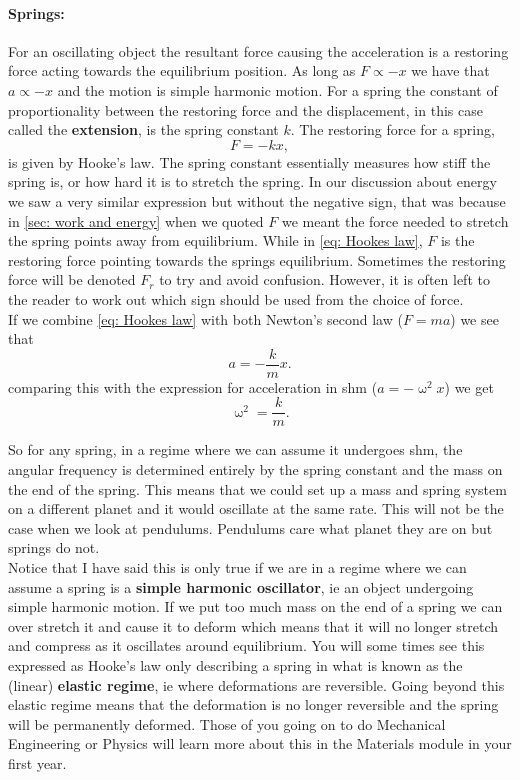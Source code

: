 \documentclass[a4paper,12pt]{book}
\begin{document}
\paragraph{Springs:} For an oscillating object the resultant force causing the acceleration is a restoring force acting towards the equilibrium position. As long as $F\propto -x$ we have that $a\propto -x$ and the motion is simple harmonic motion. For a spring the constant of proportionality between the restoring force and the displacement, in this case called the \textbf{extension}, is the spring constant $k$. The restoring force for a spring,  
\begin{equation}
F=-k x,
\label{eq: Hookes law}
\end{equation}
is given by Hooke's law. The spring constant essentially measures how stiff the spring is, or how hard it is to stretch the spring.  In our discussion about energy we saw a very similar expression but without the negative sign, that was because in \cref{sec: work and energy} when we quoted $F$ we meant the force needed to stretch the spring points away from equilibrium. While in \cref{eq: Hookes law}, $F$ is the restoring force pointing towards the springs equilibrium. Sometimes the restoring force will be denoted $F_{r}$ to try and avoid confusion. However, it is often left to the reader to work out which sign should be used from the choice of force.\\

If we combine \cref{eq: Hookes law} with both Newton's second law ($F=ma$) we see that
\begin{equation*}
a=-\frac{k}{m}x.
\end{equation*}
comparing this with the expression for acceleration in shm ($a=-\upomega^{2}x$) we get 
\begin{equation}
\upomega^{2}=\frac{k}{m}.
\end{equation}

So for any spring, in a regime where we can assume it undergoes shm, the angular frequency is determined entirely by the spring constant and the mass on the end of the spring. This means that we could set up a mass and spring system on a different planet and it would oscillate at the same rate. This will not be the case when we look at pendulums. Pendulums care what planet they are on but springs do not.\\

Notice that I have said this is only true if we are in a regime where we can assume a spring is a \textbf{simple harmonic oscillator}, ie an object undergoing simple harmonic motion. If we put too much mass on the end of a spring we can over stretch it and cause it to deform which means that it will no longer stretch and compress as it oscillates around equilibrium. You will some times see this expressed as Hooke's law only describing a spring in what is known as the (linear) \textbf{elastic regime}, ie where deformations are reversible. Going beyond this elastic regime means that the deformation is no longer reversible and the spring will be permanently deformed. Those of you going on to do Mechanical Engineering or Physics will learn more about this in the Materials module in your first year.\\
\end{document}
